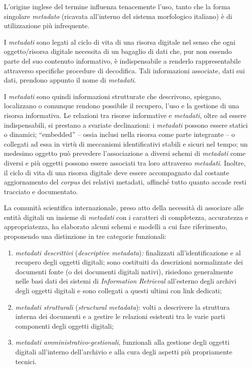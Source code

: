 \documentclass[
  b5paper,
  twoside,
  12pt,
  chapterprefix=false,
  bibliography=totocnumbered,
  parskip=false]{scrbook}
\begin{document}
L'origine inglese del termine influenza tenacemente l'uso, tanto che la
forma singolare \emph{metadato} (ricavata all'interno del sistema morfologico
italiano) è di utilizzazione più infrequente.

I \emph{metadati} sono legati al ciclo di vita di una risorsa digitale nel
senso che ogni oggetto/risorsa digitale necessita di un bagaglio di dati
che, pur non essendo parte del suo contenuto informativo, è
indispensabile a renderlo rappresentabile attraverso specifiche
procedure di decodifica. Tali informazioni associate, dati sui dati,
prendono appunto il nome di \emph{metadati}.

I \emph{metadati} sono quindi informazioni strutturate che descrivono,
spiegano, localizzano o comunque rendono possibile il recupero, l'uso e
la gestione di una risorsa informativa. Le relazioni tra risorse
informative e \emph{metadati}, oltre ad essere indispensabili, si prestano a
svariate declinazioni: i \emph{metadati} possono essere statici o dinamici;
\enquote{embedded} -- ossia inclusi nella risorsa come parte integrante -- o
collegati ad essa in virtù di meccanismi identificativi stabili e sicuri
nel tempo; un medesimo oggetto può prevedere l'associazione a diversi
schemi di \emph{metadati} come diversi e più oggetti possono essere associati
tra loro attraverso \emph{metadati}. Inoltre, il ciclo di vita di una risorsa
digitale deve essere accompagnato dal costante aggiornamento del
\emph{corpus} dei relativi metadati, affinché tutto quanto accade resti
tracciato e documentato.

La comunità scientifica internazionale, preso atto della necessità di
associare alle entità digitali un insieme di \emph{metadati} con i caratteri
di completezza, accuratezza e appropriatezza, ha elaborato alcuni schemi
e modelli a cui fare riferimento, proponendo una distinzione in tre
categorie funzionali:

\begin{enumerate}
\def\labelenumi{\arabic{enumi}.}
\item
  \emph{metadati descrittivi} (\emph{descriptive metadata})\emph{:} finalizzati
  all'identificazione e al recupero degli oggetti digitali; sono
  costituiti da descrizioni normalizzate dei documenti fonte (o dei
  documenti digitali nativi), risiedono generalmente nelle basi dati
  dei sistemi di \emph{Information Retrieval} all'esterno degli archivi
  degli oggetti digitali e sono collegati a questi ultimi con link
  dedicati;
\item
  \emph{metadati strutturali} (\emph{structural metadata}): volti a descrivere
  la struttura interna dei documenti e a gestire le relazioni
  esistenti tra le varie parti componenti degli oggetti digitali;
\item
  \emph{metadati amministrativo-gestionali}, funzionali alla gestione degli
  oggetti digitali all'interno dell'archivio e alla cura degli
  aspetti più propriamente tecnici.
\end{enumerate}
\end{document}
